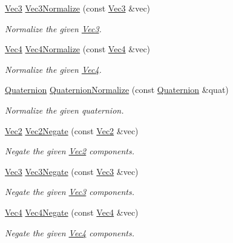 \begin{DoxyCompactItemize}
\hyperlink{classgfxmath_1_1_vec3}{Vec3} \hyperlink{group___s_i_s_d_vec_math_gafdbff8ff3fad75f9a9e924a58fcc4f4a}{Vec3\+Normalize} (const \hyperlink{classgfxmath_1_1_vec3}{Vec3} \&vec)
\begin{DoxyCompactList}\small\item\em Normalize the given \hyperlink{classgfxmath_1_1_vec3}{Vec3}. \end{DoxyCompactList}\item 
\hyperlink{classgfxmath_1_1_vec4}{Vec4} \hyperlink{group___s_i_s_d_vec_math_gaf1fa3fbf9843a509f3b8a476aa18361b}{Vec4\+Normalize} (const \hyperlink{classgfxmath_1_1_vec4}{Vec4} \&vec)
\begin{DoxyCompactList}\small\item\em Normalize the given \hyperlink{classgfxmath_1_1_vec4}{Vec4}. \end{DoxyCompactList}\item 
\hyperlink{classgfxmath_1_1_quaternion}{Quaternion} \hyperlink{group___s_i_s_d_vec_math_ga0b4dfb2804fb5c44a112dc6b8ea43278}{Quaternion\+Normalize} (const \hyperlink{classgfxmath_1_1_quaternion}{Quaternion} \&quat)
\begin{DoxyCompactList}\small\item\em Normalize the given quaternion. \end{DoxyCompactList}\item 
\hyperlink{classgfxmath_1_1_vec2}{Vec2} \hyperlink{group___s_i_s_d_vec_math_ga55959c707ef1b444eb2d71009a201aa2}{Vec2\+Negate} (const \hyperlink{classgfxmath_1_1_vec2}{Vec2} \&vec)
\begin{DoxyCompactList}\small\item\em Negate the given \hyperlink{classgfxmath_1_1_vec2}{Vec2} components. \end{DoxyCompactList}\item 
\hyperlink{classgfxmath_1_1_vec3}{Vec3} \hyperlink{group___s_i_s_d_vec_math_ga8ccc52146f984a79c566ee8348e410e2}{Vec3\+Negate} (const \hyperlink{classgfxmath_1_1_vec3}{Vec3} \&vec)
\begin{DoxyCompactList}\small\item\em Negate the given \hyperlink{classgfxmath_1_1_vec3}{Vec3} components. \end{DoxyCompactList}\item 
\hyperlink{classgfxmath_1_1_vec4}{Vec4} \hyperlink{group___s_i_s_d_vec_math_ga9ba6951d54c6a4d9d513580f5bf3b928}{Vec4\+Negate} (const \hyperlink{classgfxmath_1_1_vec4}{Vec4} \&vec)
\begin{DoxyCompactList}\small\item\em Negate the given \hyperlink{classgfxmath_1_1_vec4}{Vec4} components. \end{DoxyCompactList}\item 

\end{DoxyCompactItemize}

